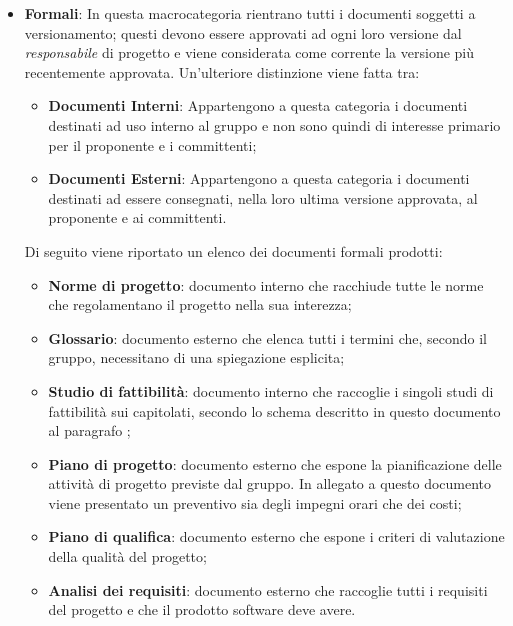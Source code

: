 \begin{itemize}
    \item \textbf{Formali}: In questa macrocategoria rientrano tutti i documenti soggetti a versionamento; questi devono 
    essere approvati ad ogni loro versione dal \emph{responsabile} di progetto e viene considerata come corrente la 
    versione più recentemente approvata. Un'ulteriore distinzione viene fatta tra:
    \begin{itemize}
        \item \textbf{Documenti Interni}: Appartengono a questa categoria i documenti destinati ad uso interno al 
        gruppo e non sono quindi di interesse primario per il proponente e i committenti;
        \item \textbf{Documenti Esterni}: Appartengono a questa categoria i documenti destinati ad essere consegnati, 
        nella loro ultima versione approvata, al proponente e ai committenti.
    \end{itemize}
    Di seguito viene riportato un elenco dei documenti formali prodotti:
    \begin{itemize}
        \item \textbf{Norme di progetto}: documento interno che racchiude tutte le norme che regolamentano il progetto 
        nella sua interezza;
        \item \textbf{Glossario}: documento esterno che elenca tutti i termini che, secondo il gruppo, necessitano di 
        una spiegazione esplicita;
        \item \textbf{Studio di fattibilità}: documento interno che raccoglie i singoli studi di fattibilità sui 
        capitolati, secondo lo schema descritto in questo documento al paragrafo ;
        \item \textbf{Piano di progetto}: documento esterno che espone la pianificazione delle attività di progetto 
        previste dal gruppo. In allegato a questo documento viene presentato un preventivo sia degli impegni orari che 
        dei costi;
        \item \textbf{Piano di qualifica}: documento esterno che espone i criteri di valutazione della qualità del 
        progetto;
        \item \textbf{Analisi dei requisiti}: documento esterno che raccoglie tutti i requisiti del progetto e che il 
        prodotto software deve avere.
  \end{itemize}
  
\end{itemize}

